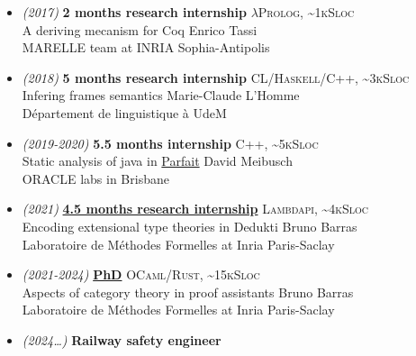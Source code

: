 \documentclass[a4paper,11pt]{extarticle}
\newcommand{\lang}[2]{\hfill \textsc{\scriptsize #1, \textasciitilde#2Sloc}}
\newcommand{\director}[1]{\hfill {\scriptsize #1}}
\begin{document}
\begin{minipage}[c][282mm][t]{0.60\linewidth}
{        \begin{itemize}
          \itemsep0em
          \item \emph{\small (2017)} \textbf{2 months research internship}
                \lang{$\lambda$Prolog}{1k}\\
                A deriving mecanism for Coq
                \director{Enrico Tassi} \\
                MARELLE team at INRIA Sophia-Antipolis
          \item \emph{\small (2018)} \textbf{5 months research internship}
                \lang{CL/Haskell/C++}{3k}\\
                Infering frames semantics
                \director{Marie-Claude L'Homme}\\
                Département de linguistique à UdeM
          \item \emph{\small (2019-2020)} \textbf{5.5 months internship}
                \lang{C++}{5k}\\
                Static analysis of java in \href{https://labs.oracle.com/pls/apex/f?p=LABS:project_details:0:13}{Parfait}
                \director{David Meibusch}\\
                ORACLE labs in Brisbane
          \item \emph{\small (2021)} \textbf{\href{https://github.com/dwarfmaster/ett-in-lambdapi}{4.5 months research internship}}
                \lang{Lambdapi}{4k}\\
                Encoding extensional type theories in Dedukti
                \director{Bruno Barras} \\
                Laboratoire de Méthodes Formelles at Inria Paris-Saclay
          \item \emph{\small (2021-2024)} \textbf{\href{https://github.com/dwarfmaster/commutative-diagrams}{PhD}}
                \lang{OCaml/Rust}{15k} \\
                Aspects of category theory in proof assistants
                \director{Bruno Barras} \\
                Laboratoire de Méthodes Formelles at Inria Paris-Saclay
          \item \emph{\small (2024\dots)} \textbf{Railway safety engineer} \\

\end{itemize}}
\end{minipage}
\end{document}
